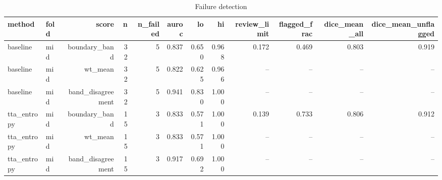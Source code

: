 \begin{table}[t]
\centering
\caption{Failure detection}
\label{tab:fail}
\begin{tabular}{llrrrrrrrrrr}
\hline
method & fold & score & n & n\_failed & auroc & lo & hi & review\_limit & flagged\_frac & dice\_mean\_all & dice\_mean\_unflagged \\
\hline
baseline & mid & boundary\_band & 32 & 5 & 0.837 & 0.650 & 0.968 & 0.172 & 0.469 & 0.803 & 0.919 \\
baseline & mid & wt\_mean & 32 & 5 & 0.822 & 0.625 & 0.966 & – & – & – & – \\
baseline & mid & band\_disagreement & 32 & 5 & 0.941 & 0.830 & 1.000 & – & – & – & – \\
tta\_entropy & mid & boundary\_band & 15 & 3 & 0.833 & 0.571 & 1.000 & 0.139 & 0.733 & 0.806 & 0.912 \\
tta\_entropy & mid & wt\_mean & 15 & 3 & 0.833 & 0.571 & 1.000 & – & – & – & – \\
tta\_entropy & mid & band\_disagreement & 15 & 3 & 0.917 & 0.692 & 1.000 & – & – & – & – \\
\hline
\end{tabular}
\end{table}
